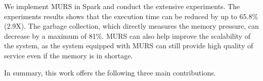 

We implement MURS in Spark and conduct the extensive experiments. The experiments results shows that the execution time can be reduced by up to 65.8\% (2.9X). The garbage collection, which directly measures the memory pressure, can decrease by a maximum of 81\%. MURS can also help improve the scalability of the system, as the system equipped with MURS can still provide high quality of service even if the memory is in shortage. 

In summary, this work offers the following three main contributions.


